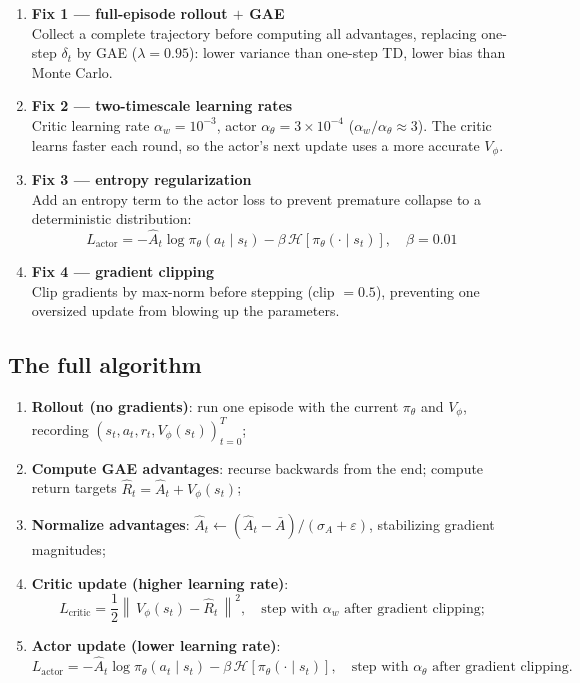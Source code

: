 \documentclass{article}
\begin{document}
\begin{enumerate}
  \item \textbf{Fix 1 --- full-episode rollout $+$ GAE}\\
        Collect a complete trajectory before computing all advantages, replacing one-step $\delta_t$ by GAE ($\lambda = 0.95$): lower variance than one-step TD, lower bias than Monte Carlo.

  \item \textbf{Fix 2 --- two-timescale learning rates}\\
        Critic learning rate $\alpha_w = 10^{-3}$, actor $\alpha_\theta = 3\times 10^{-4}$ ($\alpha_w / \alpha_\theta \approx 3$). The critic learns faster each round, so the actor's next update uses a more accurate $V_\phi$.

  \item \textbf{Fix 3 --- entropy regularization}\\
        Add an entropy term to the actor loss to prevent premature collapse to a deterministic distribution:
        \[
        L_{\text{actor}} = -\hat{A}_t \log\pi_\theta(a_t \mid s_t) - \beta\,\mathcal{H}[\pi_\theta(\cdot \mid s_t)], \quad \beta = 0.01
        \]

  \item \textbf{Fix 4 --- gradient clipping}\\
        Clip gradients by max-norm before stepping (clip $= 0.5$), preventing one oversized update from blowing up the parameters.
\end{enumerate}

\subsection*{The full algorithm}

\begin{enumerate}
  \item \textbf{Rollout (no gradients)}: run one episode with the current $\pi_\theta$ and $V_\phi$, recording $(s_t,a_t,r_t,V_\phi(s_t))_{t=0}^{T}$;
  \item \textbf{Compute GAE advantages}: recurse backwards from the end; compute return targets $\hat{R}_t = \hat{A}_t + V_\phi(s_t)$;
  \item \textbf{Normalize advantages}: $\hat{A}_t \leftarrow (\hat{A}_t - \bar{A}) / (\sigma_A + \varepsilon)$, stabilizing gradient magnitudes;
  \item \textbf{Critic update (higher learning rate)}:
        \[
        L_{\text{critic}} = \frac{1}{2}\left\|\,V_\phi(s_t) - \hat{R}_t\,\right\|^2,
        \quad \text{step with } \alpha_w \text{ after gradient clipping;}
        \]
  \item \textbf{Actor update (lower learning rate)}:
        \[
        L_{\text{actor}} = -\hat{A}_t\log\pi_\theta(a_t \mid s_t) - \beta\,\mathcal{H}[\pi_\theta(\cdot\mid s_t)],
        \quad \text{step with } \alpha_\theta \text{ after gradient clipping.}
        \]
\end{enumerate}
\end{document}
